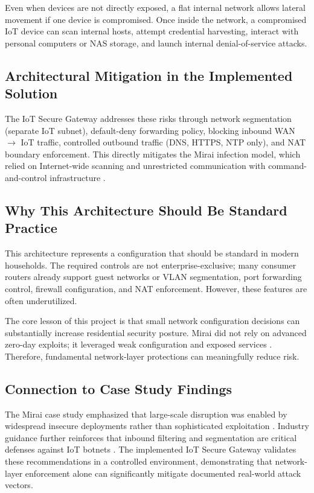 \documentclass[journal]{IEEEtran}
\begin{document}
Even when devices are not directly exposed, a flat internal network allows lateral movement if one device is compromised. Once inside the network, a compromised IoT device can scan internal hosts, attempt credential harvesting, interact with personal computers or NAS storage, and launch internal denial-of-service attacks.

\subsection{Architectural Mitigation in the Implemented Solution}
The IoT Secure Gateway addresses these risks through network segmentation (separate IoT subnet), default-deny forwarding policy, blocking inbound WAN $\rightarrow$ IoT traffic, controlled outbound traffic (DNS, HTTPS, NTP only), and NAT boundary enforcement. This directly mitigates the Mirai infection model, which relied on Internet-wide scanning and unrestricted communication with command-and-control infrastructure \cite{mirai_usenix}.

\subsection{Why This Architecture Should Be Standard Practice}
This architecture represents a configuration that should be standard in modern households. The required controls are not enterprise-exclusive; many consumer routers already support guest networks or VLAN segmentation, port forwarding control, firewall configuration, and NAT enforcement. However, these features are often underutilized.

The core lesson of this project is that small network configuration decisions can substantially increase residential security posture. Mirai did not rely on advanced zero-day exploits; it leveraged weak configuration and exposed services \cite{mirai_usenix}. Therefore, fundamental network-layer protections can meaningfully reduce risk.

\subsection{Connection to Case Study Findings}
The Mirai case study emphasized that large-scale disruption was enabled by widespread insecure deployments rather than sophisticated exploitation \cite{mirai_usenix}. Industry guidance further reinforces that inbound filtering and segmentation are critical defenses against IoT botnets \cite{cloudflare_mirai, cisa_mirai}. The implemented IoT Secure Gateway validates these recommendations in a controlled environment, demonstrating that network-layer enforcement alone can significantly mitigate documented real-world attack vectors.
\end{document}
